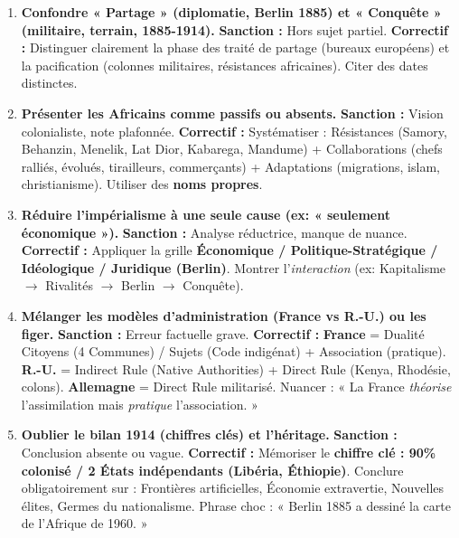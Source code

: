 \documentclass[11pt]{article}
\newcommand{\cle}[1]{{\popxbold\color{popdark}#1}}
\begin{document}
\begin{attention}
\begin{enumerate}
    \item \textbf{Confondre « Partage » (diplomatie, Berlin 1885) et « Conquête » (militaire, terrain, 1885-1914).} \rightarrow \textbf{Sanction :} Hors sujet partiel. \textbf{Correctif :} Distinguer clairement la phase des \cle{traité de partage} (bureaux européens) et la \cle{pacification} (colonnes militaires, résistances africaines). Citer des dates distinctes.
    \item \textbf{Présenter les Africains comme passifs ou absents.} \rightarrow \textbf{Sanction :} Vision colonialiste, note plafonnée. \textbf{Correctif :} Systématiser : \cle{Résistances} (Samory, Behanzin, Menelik, Lat Dior, Kabarega, Mandume) + \cle{Collaborations} (chefs ralliés, évolués, tirailleurs, commerçants) + \cle{Adaptations} (migrations, islam, christianisme). Utiliser des \textbf{noms propres}.
    \item \textbf{Réduire l'impérialisme à une seule cause (ex: « seulement économique »).} \rightarrow \textbf{Sanction :} Analyse réductrice, manque de nuance. \textbf{Correctif :} Appliquer la grille \textbf{Économique / Politique-Stratégique / Idéologique / Juridique (Berlin)}. Montrer l'\emph{interaction} (ex: Kapitalisme $\to$ Rivalités $\to$ Berlin $\to$ Conquête).
    \item \textbf{Mélanger les modèles d'administration (France vs R.-U.) ou les figer.} \rightarrow \textbf{Sanction :} Erreur factuelle grave. \textbf{Correctif :} \textbf{France} = Dualité \cle{Citoyens (4 Communes) / Sujets (Code indigénat)} + \cle{Association} (pratique). \textbf{R.-U.} = \cle{Indirect Rule} (Native Authorities) + \cle{Direct Rule} (Kenya, Rhodésie, colons). \textbf{Allemagne} = \cle{Direct Rule} militarisé. Nuancer : « La France \emph{théorise} l'assimilation mais \emph{pratique} l'association. »
    \item \textbf{Oublier le bilan 1914 (chiffres clés) et l'héritage.} \rightarrow \textbf{Sanction :} Conclusion absente ou vague. \textbf{Correctif :} Mémoriser le \textbf{chiffre clé : 90\% colonisé / 2 États indépendants (Libéria, Éthiopie)}. Conclure obligatoirement sur : \cle{Frontières artificielles}, \cle{Économie extravertie}, \cle{Nouvelles élites}, \cle{Germes du nationalisme}. Phrase choc : « Berlin 1885 a dessiné la carte de l'Afrique de 1960. »
\end{enumerate}
\end{attention}
\end{document}
